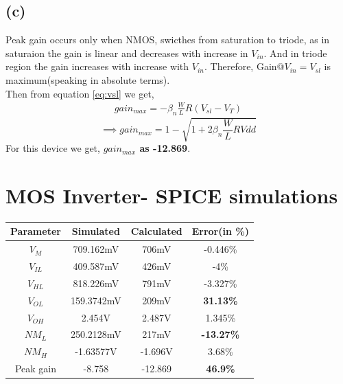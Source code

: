 \documentclass{article}
\begin{document}
\subsection*{(c)}
Peak gain occurs only when NMOS, swicthes from saturation to triode, as in saturaion the gain is linear and decreases with increase in $V_{in}$. And in triode region the gain increases with increase with $V_{in}$. Therefore, Gain@$V_{in}=V_{sl}$ is maximum(speaking in absolute terms).\\
Then from equation \eqref{eq:vsl} we get,
\begin{gather*}
gain_{max} = -{{\beta}_n}{\frac{W}{L}}R(V_{sl}-V_T)
\end{gather*}
\begin{equation} \label{eq:gmax}
\implies gain_{max} = 1 -\sqrt{1 + 2{{\beta}_n}{\frac{W}{L}}RVdd}
\end{equation}
For this device we get, \textbf{$gain_{max}$ as -12.869}.
\section{\textbf{MOS Inverter- SPICE simulations}}
\begin{center}
\begin{tabular}{|c|c|c|c|}
\hline
\textbf{Parameter} & \textbf{Simulated} & \textbf{Calculated} & \textbf{Error(in \%)}\\
\hline
$V_{M}$ & 709.162mV & 706mV & -0.446\%\\
\hline
$V_{IL}$ & 409.587mV & 426mV & -4\%\\
\hline
$V_{HL}$ & 818.226mV & 791mV & -3.327\%\\
\hline
$V_{OL}$ & 159.3742mV & 209mV & \textbf{31.13\%}\\
\hline
$V_{OH}$ & 2.454V & 2.487V & 1.345\%\\
\hline
$NM_L$ & 250.2128mV & 217mV & \textbf{-13.27\%}\\
\hline
$NM_H$ & -1.63577V & -1.696V & 3.68\%\\
\hline
Peak gain & -8.758 & -12.869 & \textbf{46.9\%}\\
\hline
\end{tabular}
\end{center}
\end{document}
